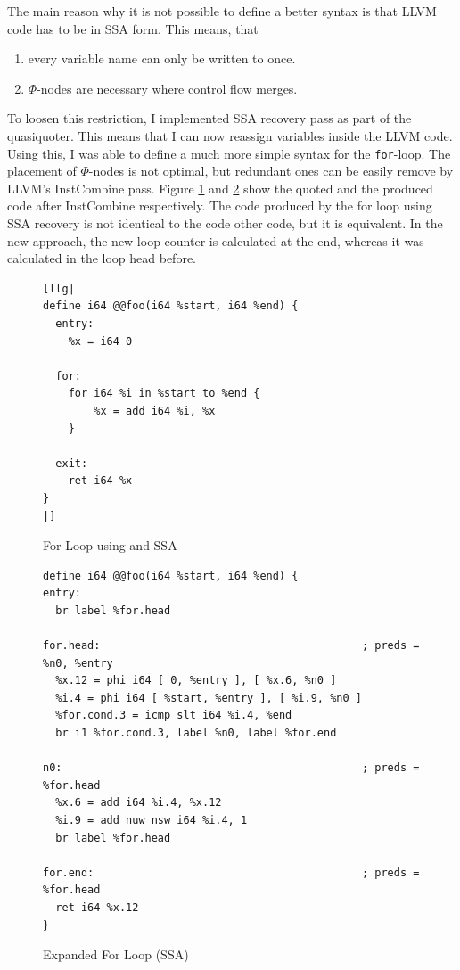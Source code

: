 \documentclass[a4paper,bibliography=totocnumbered,parskip,headsepline]{scrbook}
\begin{document}
The main reason why it is not possible to define a better syntax is that LLVM code has to be in SSA form.
This means, that
\begin{enumerate}
 \item every variable name can only be written to once.
 \item $\Phi$-nodes are necessary where control flow merges.
\end{enumerate}

To loosen this restriction, I implemented SSA recovery pass as part of the quasiquoter.
This means that I can now reassign variables inside the LLVM code.
Using this, I was able to define a much more simple syntax for the \lstinline{for}-loop.
The placement of $\Phi$-nodes is not optimal, but redundant ones can be easily remove by LLVM's InstCombine pass.
Figure \ref{fig:forquoteSSA} and \ref{fig:forquoteSSA1} show the quoted and the produced code after InstCombine respectively.
The code produced by the for loop using SSA recovery is not identical to the code other code, but it is equivalent.
In the new approach, the new loop counter is calculated at the end, whereas it was calculated in the loop head before.

\begin{figure}
\begin{lstlisting}
[llg|
define i64 @@foo(i64 %start, i64 %end) {
  entry:
    %x = i64 0

  for:
    for i64 %i in %start to %end {
        %x = add i64 %i, %x
    }

  exit:
    ret i64 %x
}
|]
\end{lstlisting}
\caption{For Loop using  and SSA}
\label{fig:forquoteSSA}
\end{figure}

\begin{figure}
\begin{lstlisting}
define i64 @@foo(i64 %start, i64 %end) {
entry:
  br label %for.head

for.head:                                         ; preds = %n0, %entry
  %x.12 = phi i64 [ 0, %entry ], [ %x.6, %n0 ]
  %i.4 = phi i64 [ %start, %entry ], [ %i.9, %n0 ]
  %for.cond.3 = icmp slt i64 %i.4, %end
  br i1 %for.cond.3, label %n0, label %for.end

n0:                                               ; preds = %for.head
  %x.6 = add i64 %i.4, %x.12
  %i.9 = add nuw nsw i64 %i.4, 1
  br label %for.head

for.end:                                          ; preds = %for.head
  ret i64 %x.12
}
\end{lstlisting}
\caption{Expanded For Loop (SSA)}
\label{fig:forquoteSSA1}
\end{figure}
\end{document}
